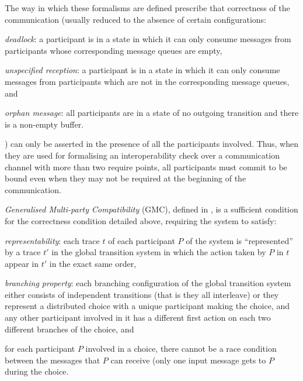 The way in which these formalisms are defined prescribe that correctness of the communication (usually reduced to the absence of certain configurations\cite{lange:popl15}:
\begin{inparaenum}[1)]
\item \emph{deadlock}: a participant is in a state in which it can only consume messages from participants whose corresponding message queues are empty,
\item \emph{unspecified reception}: a participant is in a state in which it can only consume messages from participants which are not in the corresponding message queues, and
\item \emph{orphan message}: all participants are in a state of no outgoing transition and there is a non-empty buffer.
\end{inparaenum}
) can only be asserted in the presence of all the participants involved. Thus, when they are used for formalising an interoperability check over a communication channel with more than two require points, all participants must commit to be bound even when they may not be required at the beginning of the communication.

\emph{Generalised Multi-party Compatibility} (GMC), defined in \cite{lange:popl15}, is a sufficient condition for the correctness condition detailed above, requiring the system to satisfy:
\begin{inparaenum}[1)]
\item \emph{representability}: each trace $t$ of each participant $P$ of the system is ``represented'' by a trace $t'$ in the global transition system in which the action taken by $P$ in $t$ appear in $t'$ in the exact same order, 
\item \emph{branching property}: each branching configuration of the global transition system either consists of independent transitions (that is they all interleave) or they represent a distributed choice with a unique participant making the choice, and any other participant involved in it has a different first action on each two different branches of the choice, and 
\item for each participant $P$ involved in a choice, there cannot be a race condition between the messages that $P$ can receive (only one input message gets to $P$ during the choice.
\end{inparaenum}

